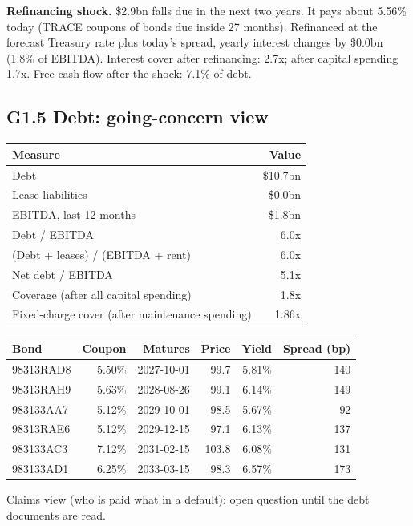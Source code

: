 \documentclass[11pt,a4paper]{article}
\begin{document}
\textbf{Refinancing shock.} \$2.9bn falls due in the next two years. It pays about 5.56\% today (TRACE coupons of bonds due inside 27 months). Refinanced at the forecast Treasury rate plus today's spread, yearly interest changes by \$0.0bn (1.8\% of EBITDA). Interest cover after refinancing: 2.7x; after capital spending 1.7x. Free cash flow after the shock: 7.1\% of debt.
\subsection*{G1.5 Debt: going-concern view}
\begin{center}\footnotesize\setlength{\tabcolsep}{3.5pt}\begin{tabular}{@{}lr@{}}\toprule
Measure & Value \\\midrule
Debt & \$10.7bn \\
Lease liabilities & \$0.0bn \\
EBITDA, last 12 months & \$1.8bn \\
Debt / EBITDA & 6.0x \\
(Debt + leases) / (EBITDA + rent) & 6.0x \\
Net debt / EBITDA & 5.1x \\
Coverage (after all capital spending) & 1.8x \\
Fixed-charge cover (after maintenance spending) & 1.86x \\
\bottomrule\end{tabular}\end{center}
\begin{center}\footnotesize\setlength{\tabcolsep}{3.5pt}\begin{tabular}{@{}lrrrrr@{}}\toprule
Bond & Coupon & Matures & Price & Yield & Spread (bp) \\\midrule
98313RAD8 & 5.50\% & 2027-10-01 & 99.7 & 5.81\% & 140 \\
98313RAH9 & 5.63\% & 2028-08-26 & 99.1 & 6.14\% & 149 \\
983133AA7 & 5.12\% & 2029-10-01 & 98.5 & 5.67\% & 92 \\
98313RAE6 & 5.12\% & 2029-12-15 & 97.1 & 6.13\% & 137 \\
983133AC3 & 7.12\% & 2031-02-15 & 103.8 & 6.08\% & 131 \\
983133AD1 & 6.25\% & 2033-03-15 & 98.3 & 6.57\% & 173 \\
\bottomrule\end{tabular}\end{center}
Claims view (who is paid what in a default): open question until the debt documents are read.
\end{document}
